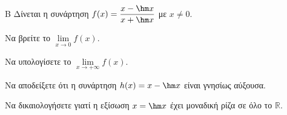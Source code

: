 \begin{thema}{Β}
Δίνεται η συνάρτηση $f(x) = \dfrac{x - \hm x}{x + \hm x}$ με $x\ne0$.
\begin{erwthma}
\item Να βρείτε το $\lim\limits_{x \to 0} f(x)$.
\item Να υπολογίσετε το $\lim\limits_{x \to +\infty} f(x)$.
\item Να αποδείξετε ότι η συνάρτηση $h(x) = x - \hm x$ είναι γνησίως αύξουσα.
\item Να δικαιολογήσετε γιατί η εξίσωση $x = \hm x$ έχει μοναδική ρίζα σε όλο το $\mathbb{R}$.
\end{erwthma}
\end{thema}
